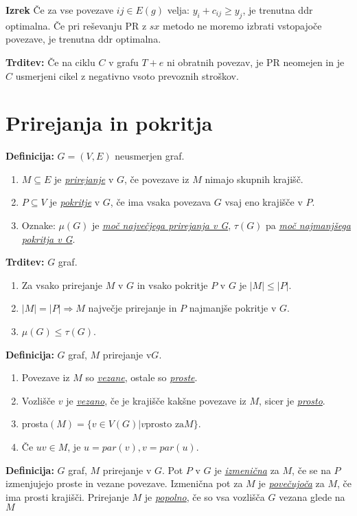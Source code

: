\documentclass[8pt,a4paper]{amsart}
\theoremstyle{definition} %
\theoremstyle{plain} %
\begin{document}
\textbf{Izrek} Če za vse povezave $ij \in E(g)$ velja: $y_i + c_{ij} \geq y_j$, je trenutna ddr optimalna. Če pri reševanju PR z $sx$ metodo ne moremo izbrati vstopajoče povezave, je trenutna ddr optimalna.

\textbf{Trditev:} Če na ciklu $C$ v grafu $T+e$ ni obratnih povezav, je PR neomejen in je $C$ usmerjeni cikel z negativno vsoto prevoznih stroškov.

\section{Prirejanja in pokritja}

\textbf{Definicija:} $G=(V,E)$ neusmerjen graf.
\begin{enumerate}[1.]
\item $M \subseteq E$ je \emph{\underline{prirejanje}} v $G$, če povezave iz $M$ nimajo skupnih krajišč.
\item $P \subseteq V$ je \emph{\underline{pokritje}} v $G$, če ima vsaka povezava $G$ vsaj eno krajišče v $P$.
\item Oznake: $\mu (G)$ je \emph{\underline{moč največjega prirejanja v G}}, $\tau (G)$ pa \emph{\underline{moč najmanjšega pokritja v G}}.
\end{enumerate}
\textbf{Trditev:} $G$ graf.

\begin{enumerate}
\item Za vsako prirejanje $M$ v $G$ in vsako pokritje $P$ v $G$ je $|M| \leq |P|$.
\item $|M|=|P| \Longrightarrow M$ največje prirejanje in $P$ najmanjše pokritje v $G$.
\item $\mu (G) \leq \tau (G)$.
\end{enumerate}

\textbf{Definicija:} $G$ graf, $M$ prirejanje v$G$.
\begin{enumerate}
\item Povezave iz $M$ so \emph{\underline{vezane}}, ostale so \emph{\underline{proste}}.
\item Vozlišče $v$ je \emph{\underline{vezano}}, če je krajišče kakšne povezave iz $M$, sicer je \emph{\underline{prosto}}.
\item prosta$(M) = \{v \in V(G) | v \text{prosto za} M \}$.
\item Če $uv \in M$, je $u = par(v), v= par(u)$.
\end{enumerate}

\textbf{Definicija:} $G$ graf, $M$ prirejanje v $G$. Pot $P$ v $G$ je \emph{\underline{izmenična}} za $M$, če se na $P$ izmenjujejo proste in vezane povezave.
Izmenična pot za $M$ je \emph{\underline{povečujoča}} za $M$, če ima prosti krajišči.
Prirejanje $M$ je \emph{\underline{popolno}}, če so vsa vozlišča $G$ vezana glede na $M$
\end{document}
